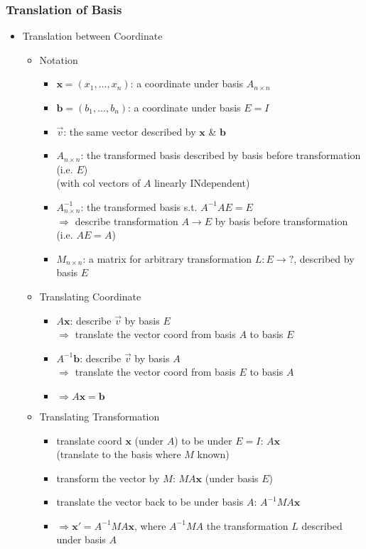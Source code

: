 \subsubsection{Translation of Basis}
\begin{itemize}
\item Translation between Coordinate
	\begin{itemize}
	\item Notation
		\begin{itemize}
		\item $\mathbf x=(x_1,...,x_n)$: a coordinate under basis $A_{n\times n}$
		\item $\mathbf b=(b_1,...,b_n)$: a coordinate under basis $E=I$
		\item $\overrightarrow {v}$: the same vector described by $\mathbf x$ \& $\mathbf b$
		\item $A_{n\times n}$: the transformed basis described by basis before transformation (i.e. $E$) \\
		(with col vectors of $A$ linearly INdependent)
		\item $A_{n\times n}^{-1}$: the transformed basis s.t. $A^{-1}AE=E$ \\ 
		$\Rightarrow$ describe transformation $A\rightarrow E$ by basis before transformation (i.e. $AE=A$)
		\item $M_{n\times n}$: a matrix for arbitrary transformation $L:E\rightarrow ?$, described by basis $E$
		\end{itemize}
	\item Translating Coordinate
		\begin{itemize}
		\item $A\mathbf x$: describe $\overrightarrow {v}$ by basis $E$ \\
		$\Rightarrow$ translate the vector coord from basis $A$ to basis $E$
		\item $A^{-1}\mathbf b$: describe $\overrightarrow {v}$ by basis $A$ \\
		$\Rightarrow$ translate the vector coord from basis $E$ to basis $A$
		\item $\Rightarrow A\mathbf x = \mathbf b$
		\end{itemize}
	\item Translating Transformation
		\begin{itemize}
		\item translate coord $\mathbf x$ (under $A$) to be under $E=I$: $A\mathbf x$ \\
		(translate to the basis where $M$ known)
		\item transform the vector by $M$: $MA\mathbf x$ (under basis $E$)
		\item translate the vector back to be under basis $A$: $A^{-1}MA\mathbf x$
		\item $\Rightarrow \mathbf x' = A^{-1}MA\mathbf x$, where $A^{-1}MA$ the transformation $L$ described under basis $A$
		\end{itemize}
	\end{itemize}
\end{itemize}


